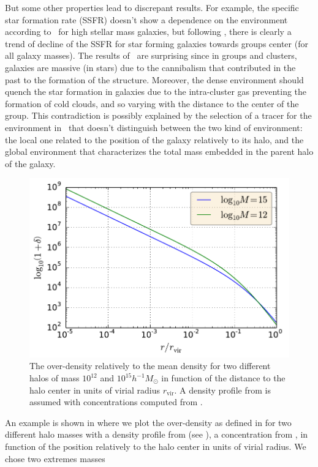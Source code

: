 But some other properties lead to discrepant results. For example, the specific
star formation rate (SSFR) doesn't show a dependence on the environment
according to~\cite{Peng+10} for high stellar mass galaxies, but following
\citet{vonderLinden+10}, there is clearly a trend of decline of the SSFR for
star forming galaxies towards groups center (for all galaxy masses). The
results of~\cite{Peng+10} are surprising since in groups and clusters, galaxies
are massive (in stars) due to the cannibalism that contributed in the past to
the formation of the structure. Moreover, the dense environment should quench
the star formation in galaxies due to the intra-cluster gas preventing the
formation of cold clouds, and so varying with the distance to the center of the
group. This contradiction is possibly explained by the selection of a tracer
for the environment in~\cite{Peng+10} that doesn't distinguish between the two
kind of environment: the local one related to the position of the galaxy
relatively to its halo, and the global environment that characterizes the total
mass embedded in the parent halo of the galaxy.
%
\begin{figure}[htb]
    \centering
    \includegraphics[width=0.6\linewidth]{figures/introduction/overdensity.pdf}
    \caption{The over-density relatively to the mean density for two different
        halos of mass $10^{12}$ and $10^{15} h^{-1} M_\odot$ in function of the
        distance to the halo center in units of virial radius $r_\mathrm{vir}$.
        A density profile from \citet{NFW+97} is assumed with concentrations
    computed from \citet{Maccio+08}.\label{fig:overdensity}}
\end{figure}
%
An example is shown in  where we plot the
over-density as defined in \citet{Peng+10} for two different halo masses with a
density profile from \citet{NFW+97} (see ), a
concentration from \citet{Maccio+08}, in function of the position relatively to
the halo center in units of virial radius. We chose two extremes masses
